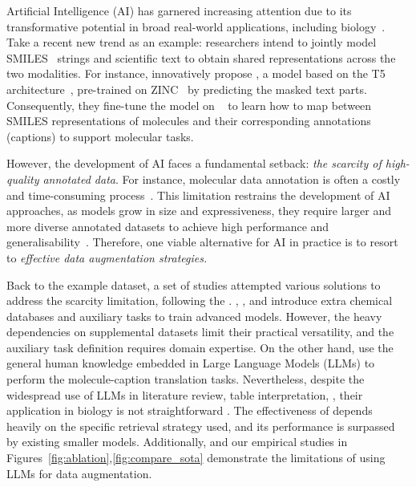 

Artificial Intelligence (AI) has garnered increasing attention due to its transformative potential in broad real-world applications, including biology~\cite{SLGBHBL19,PZZWGWXY23,ZM23}. 
Take a recent new trend as an example: researchers intend to jointly model SMILES~\cite{W88}
strings and scientific text to obtain shared representations across the two modalities.
For instance, \citet{ELRHCJ22} innovatively propose \oldmodel, a model based on the T5 architecture~\cite{RSRLNMZLL20}, pre-trained on ZINC~\cite{SI15} by predicting the masked text parts.  
Consequently, they fine-tune the model on \olddataset~\cite{EZJ21} to learn how to map between SMILES representations of molecules and their corresponding annotations (captions) to support molecular tasks. 

However, the development of AI faces a fundamental setback: \emph{the scarcity of high-quality annotated data}. 
% 
For instance, molecular data annotation is often a costly and time-consuming process~\cite{DGH16}. 
This limitation restrains the development of AI approaches, as models grow in size and expressiveness, they require larger and more diverse annotated datasets to achieve high performance and generalisability~\cite{DCLT19,HGC23}.
Therefore, one viable alternative for AI in practice is to resort to \emph{effective data augmentation strategies.}

Back to the example \olddataset dataset, a set of studies attempted various solutions to address the scarcity limitation, following the \oldmodel. 
\citet{CGBWLM23}, \citet{LZXWXQZL23}, \citet{PZZWGWXY23} and \citet{PWGLFZXQY24} introduce extra chemical databases and auxiliary tasks to train advanced models. 
However, the heavy dependencies on supplemental datasets limit their practical versatility, and the auxiliary task definition requires domain expertise. 
% 
On the other hand, \citet{LLFWLTL24} use the general human knowledge embedded in Large Language Models (LLMs) to perform the molecule-caption translation tasks. 
Nevertheless, despite the widespread use of LLMs in literature review, table interpretation, \etc, their application in biology is not straightforward \cite{LJRHHNPWR24}.
The effectiveness of \cite{LLFWLTL24} depends heavily on the specific retrieval strategy used, and its performance is surpassed by existing smaller models. 
Additionally, \citet{ZZM24} and our empirical studies in Figures~\ref{fig:ablation},\ref{fig:compare_sota} demonstrate the limitations of using LLMs for data augmentation.

